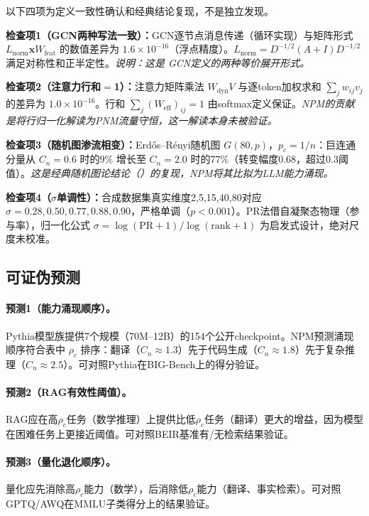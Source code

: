 \documentclass[11pt,a4paper]{article}
\newcommand{\Weff}{W_{\text{eff}}}
\newcommand{\rhoc}{\rho_c}
\newcommand{\Lnorm}{L_{\text{norm}}}
\begin{document}
以下四项为定义一致性确认和经典结论复现，不是独立发现。

\textbf{检查项1（GCN两种写法一致）：}GCN逐节点消息传递（循环实现）与矩阵形式 $\Lnorm\mathbf{x}W_{\text{feat}}$ 的数值差异为 $1.6\times10^{-16}$（浮点精度）。$\Lnorm=D^{-1/2}(A+I)D^{-1/2}$ 满足对称性和正半定性。\emph{说明：这是\citet{kipf2017gcn} GCN定义的两种等价展开形式。}

\textbf{检查项2（注意力行和$=$1）：}注意力矩阵乘法 $W_{\text{dyn}}V$ 与逐token加权求和 $\sum_j w_{ij}v_j$ 的差异为 $1.0\times10^{-16}$。行和 $\sum_j(\Weff)_{ij}=1$ 由softmax定义保证。\emph{NPM的贡献是将行归一化解读为PNM流量守恒，这一解读本身未被验证。}

\textbf{检查项3（随机图渗流相变）：}Erd\H{o}s–R\'{e}nyi随机图 $G(80,p)$，$p_c{=}1/n$：巨连通分量从 $C_n{=}0.6$ 时的9\% 增长至 $C_n{=}2.0$ 时的77\%（转变幅度0.68，超过0.3阈值）。\emph{这是经典随机图论结论（\citealt{erdos1960random}）的复现，NPM将其比拟为LLM能力涌现。}

\textbf{检查项4（$\sigma$单调性）：}合成数据集真实维度2,5,15,40,80对应 $\sigma=0.28,0.50,0.77,0.88,0.90$，严格单调（$p<0.001$）。PR法借自凝聚态物理（参与率），归一化公式 $\sigma=\log(\text{PR}+1)/\log(\text{rank}+1)$ 为启发式设计，绝对尺度未校准。

\subsection{可证伪预测}
\label{sec:predictions}
\label{sec:falsifiable}

\paragraph{预测1（能力涌现顺序）。}
Pythia模型族提供7个规模（70M–12B）的154个公开checkpoint。NPM预测涌现顺序符合表中 $\rhoc$ 排序：翻译（$C_n\approx1.3$）先于代码生成（$C_n\approx1.8$）先于复杂推理（$C_n\approx2.5$）。可对照Pythia在BIG-Bench上的得分验证。

\paragraph{预测2（RAG有效性阈值）。}
RAG应在高$\rhoc$任务（数学推理）上提供比低$\rhoc$任务（翻译）更大的增益，因为模型在困难任务上更接近阈值。可对照BEIR基准有/无检索结果验证。

\paragraph{预测3（量化退化顺序）。}
量化应先消除高$\rhoc$能力（数学），后消除低$\rhoc$能力（翻译、事实检索）。可对照GPTQ/AWQ在MMLU子类得分上的结果验证。
\end{document}

